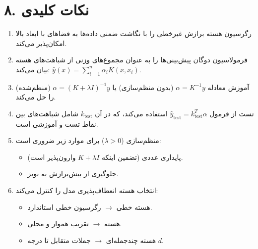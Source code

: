 \documentclass{article}
\begin{document}
\section*{۸. نکات کلیدی}
\begin{enumerate}
    \item رگرسیون هسته برازش غیرخطی را با نگاشت ضمنی داده‌ها به فضاهای با ابعاد بالا امکان‌پذیر می‌کند.
    \item فرمولاسیون دوگان پیش‌بینی‌ها را به عنوان مجموع‌های وزنی از شباهت‌های هسته بیان می‌کند: $\hat{y}(x) = \sum_{i=1}^{n} \alpha_i K(x, x_i)$.
    \item آموزش معادله $\alpha = K^{-1} y$ (بدون منظم‌سازی) یا $\alpha = (K + \lambda I)^{-1} y$ (منظم‌شده) را حل می‌کند.
    \item تست از فرمول $\hat{y}_{\text{test}} = k_{\text{test}}^T \alpha$ استفاده می‌کند، که در آن $k_{\text{test}}$ شامل شباهت‌های بین نقاط تست و آموزشی است.
    \item منظم‌سازی ($\lambda > 0$) برای موارد زیر ضروری است:
    \begin{itemize}
        \item پایداری عددی (تضمین اینکه $K + \lambda I$ وارون‌پذیر است).
        \item جلوگیری از بیش‌برازش به نویز.
    \end{itemize}
    \item انتخاب هسته انعطاف‌پذیری مدل را کنترل می‌کند:
    \begin{itemize}
        \item هسته خطی $\to$ رگرسیون خطی استاندارد.
        \item هسته  $\to$ تقریب هموار و محلی.
        \item هسته چندجمله‌ای $\to$ جملات متقابل تا درجه $d$.
    \end{itemize}
\end{enumerate}
\end{document}
